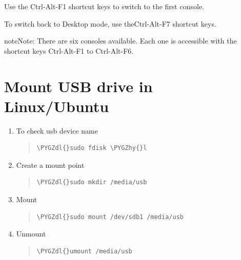 \documentclass[letterpaper,10pt,english]{sphinxmanual}
\def\PYGZdl{\char`\$}
\def\PYGZhy{\char`\-}
\begin{document}
Use the Ctrl-Alt-F1 shortcut keys to switch to the first console.

To switch back to Desktop mode, use theCtrl-Alt-F7 shortcut keys.

\begin{notice}{note}{Note:}
There are six consoles available. Each one is accessible with the shortcut keys Ctrl-Alt-F1 to Ctrl-Alt-F6.
\end{notice}


\section{Mount USB drive in Linux/Ubuntu}
\label{_source/things/mount_usb:mount-usb-drive-in-linux-ubuntu}\label{_source/things/mount_usb::doc}\begin{enumerate}
\item {} 
To check usb device name
\begin{quote}

\begin{Verbatim}[commandchars=\\\{\}]
\PYGZdl{}sudo fdisk \PYGZhy{}l
\end{Verbatim}
\end{quote}

\item {} 
Create a mount point
\begin{quote}

\begin{Verbatim}[commandchars=\\\{\}]
\PYGZdl{}sudo mkdir /media/usb
\end{Verbatim}
\end{quote}

\item {} 
Mount
\begin{quote}

\begin{Verbatim}[commandchars=\\\{\}]
\PYGZdl{}sudo mount /dev/sdb1 /media/usb
\end{Verbatim}
\end{quote}

\item {} 
Unmount
\begin{quote}

\begin{Verbatim}[commandchars=\\\{\}]
\PYGZdl{}umount /media/usb
\end{Verbatim}
\end{quote}

\end{enumerate}
\end{document}
